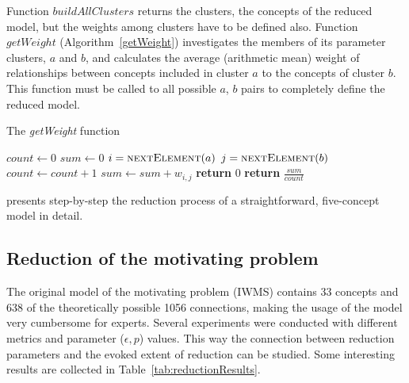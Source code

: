 \documentclass[graybox]{svmult}
\begin{document}
Function $buildAllClusters$ returns the clusters, the concepts of the reduced model, but the weights among clusters have to be defined also. Function $getWeight$ (Algorithm~\ref{getWeight}) investigates the members of its parameter clusters, $a$ and $b$, and calculates the average (arithmetic mean) weight of relationships between concepts included in cluster $a$ to the concepts of cluster $b$. This function must be called to all possible $a$, $b$ pairs to completely define the reduced model.

\begin{algorithm}
  \caption{The \emph{getWeight} function}\label{getWeight}
  \begin{algorithmic}[1]
      \State $count \gets 0$
      \State $sum \gets 0$
        \State $i = \Call{nextElement}{a}$
          \State $j = \Call{nextElement}{b}$
            \State $count \gets count + 1$
            \State $sum \gets sum + w_{i,j}$
          \EndIf
        \EndWhile
      \EndWhile
        \State \textbf{return} $0$
      \Else
        \State \textbf{return} $\frac{sum}{count}$
      \EndIf
    \EndFunction
  \end{algorithmic}
\end{algorithm}

\cite{papageorgiou2017concept} presents step-by-step the reduction 
process of a straightforward, five-concept model in detail.

\subsection{Reduction of the motivating problem}

The original model of the motivating problem (IWMS) contains 33 
concepts and 638 of the theoretically possible 1056 connections, making 
the usage of the model very cumbersome for experts. Several experiments 
were conducted with different metrics and parameter ($\epsilon, p$) 
values. This way the connection between reduction parameters and the 
evoked extent of reduction can be studied. Some interesting results are 
collected in Table~\ref{tab:reductionResults}.
\end{document}
